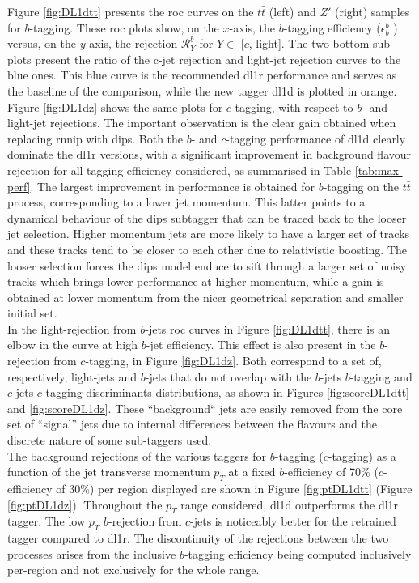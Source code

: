 Figure \ref{fig:DL1dtt} presents the \gls{roc} curves on the $t\bar{t}$ (left) and $Z'$ (right) samples for  $b$-tagging. These \gls{roc} plots show, on the $x$-axis, the $b$-tagging efficiency ($\epsilon^b_b$ ) versus, on the $y$-axis, the rejection $\mathcal{R}^b_Y$ for $Y \in$ [$c$, light]. The two bottom sub-plots present the ratio of the c-jet rejection and light-jet rejection curves to the blue ones. This blue curve is the recommended \gls{dl1r} performance and serves as the baseline of the comparison, while the new tagger \gls{dl1d} is plotted in orange. Figure \ref{fig:DL1dz} shows the same plots for $c$-tagging, with respect to $b$- and light-jet rejections. The important observation is the clear gain obtained when replacing \gls{rnnip} with \gls{dips}. Both the $b$- and $c$-tagging performance of \gls{dl1d} clearly dominate the \gls{dl1r} versions, with a significant improvement in background flavour rejection for all tagging efficiency considered, as summarised in Table \ref{tab:max-perf}. The largest improvement in performance is obtained for $b$-tagging on the $t\bar{t}$ process, corresponding to a lower jet momentum. This latter points to a dynamical behaviour of the \gls{dips} subtagger that can be traced back to the looser jet selection. Higher momentum jets are more likely to have a larger set of tracks and these tracks tend to be closer to each other due to relativistic boosting. The looser selection forces the \gls{dips} model enduce to sift through a larger set of noisy tracks which brings lower performance at higher momentum, while a gain is obtained at lower momentum from the nicer geometrical separation and smaller initial set.  \\

In the light-rejection from $b$-jets \gls{roc} curves in Figure \ref{fig:DL1dtt}, there is an elbow in the curve at high $b$-jet efficiency. This effect is also present in the $b$-rejection from $c$-tagging, in Figure \ref{fig:DL1dz}. Both correspond to a set of, respectively, light-jets and $b$-jets that do not overlap with the $b$-jets $b$-tagging and $c$-jets $c$-tagging discriminants distributions, as shown in Figures \ref{fig:scoreDL1dtt} and \ref{fig:scoreDL1dz}. These ``background`` jets are easily removed from the core set of ``signal'' jets due to internal differences between the flavours and the discrete nature of some sub-taggers used. \\

The background rejections of the various taggers for $b$-tagging ($c$-tagging) as a function of the jet transverse momentum $p_T$ at a fixed $b$-efficiency of 70\% ($c$-efficiency of 30\%) per region displayed are shown in Figure \ref{fig:ptDL1dtt} (Figure \ref{fig:ptDL1dz}). Throughout the $p_T$ range considered, \gls{dl1d} outperforms the \gls{dl1r} tagger. The low $p_T$ $b$-rejection from $c$-jets is noticeably better for the retrained tagger compared to \gls{dl1r}. The discontinuity of the rejections between the two processes arises from the inclusive $b$-tagging efficiency being computed inclusively per-region and not exclusively for the whole range. 

